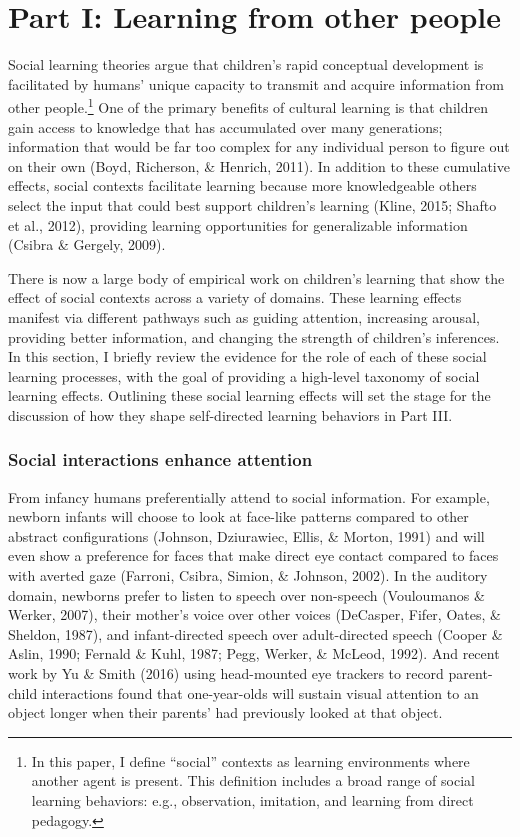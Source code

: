 \documentclass[a4paper,man,apacite,floatsintext]{apa6}
\begin{document}
\section{Part I: Learning from other
people}\label{part-i-learning-from-other-people}

Social learning theories argue that children's rapid conceptual
development is facilitated by humans' unique capacity to transmit and
acquire information from other people.\footnote{In this paper, I define
  ``social'' contexts as learning environments where another agent is
  present. This definition includes a broad range of social learning
  behaviors: e.g., observation, imitation, and learning from direct
  pedagogy.} One of the primary benefits of cultural learning is that
children gain access to knowledge that has accumulated over many
generations; information that would be far too complex for any
individual person to figure out on their own (Boyd, Richerson, \&
Henrich, 2011). In addition to these cumulative effects, social contexts
facilitate learning because more knowledgeable others select the input
that could best support children's learning (Kline, 2015; Shafto et al.,
2012), providing learning opportunities for generalizable information
(Csibra \& Gergely, 2009).

There is now a large body of empirical work on children's learning that
show the effect of social contexts across a variety of domains. These
learning effects manifest via different pathways such as guiding
attention, increasing arousal, providing better information, and
changing the strength of children's inferences. In this section, I
briefly review the evidence for the role of each of these social
learning processes, with the goal of providing a high-level taxonomy of
social learning effects. Outlining these social learning effects will
set the stage for the discussion of how they shape self-directed
learning behaviors in Part III.

\subsubsection{Social interactions enhance
attention}\label{social-interactions-enhance-attention}

From infancy humans preferentially attend to social information. For
example, newborn infants will choose to look at face-like patterns
compared to other abstract configurations (Johnson, Dziurawiec, Ellis,
\& Morton, 1991) and will even show a preference for faces that make
direct eye contact compared to faces with averted gaze (Farroni, Csibra,
Simion, \& Johnson, 2002). In the auditory domain, newborns prefer to
listen to speech over non-speech (Vouloumanos \& Werker, 2007), their
mother's voice over other voices (DeCasper, Fifer, Oates, \& Sheldon,
1987), and infant-directed speech over adult-directed speech (Cooper \&
Aslin, 1990; Fernald \& Kuhl, 1987; Pegg, Werker, \& McLeod, 1992). And
recent work by Yu \& Smith (2016) using head-mounted eye trackers to
record parent-child interactions found that one-year-olds will sustain
visual attention to an object longer when their parents' had previously
looked at that object.
\end{document}
